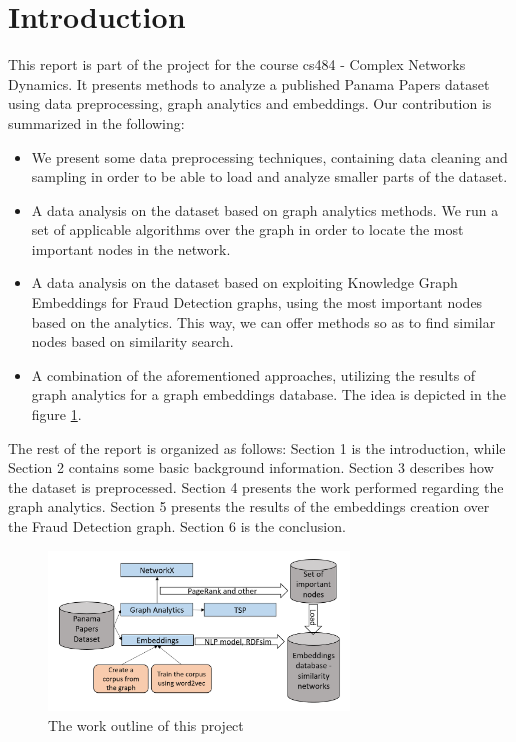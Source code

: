 \documentclass[sigconf, nonacm]{acmart}
\begin{document}
\section{Introduction}
This report is part of the project for the course cs484 - Complex Networks Dynamics. It presents methods to analyze a published Panama Papers dataset using data preprocessing, graph analytics and embeddings. Our contribution is summarized in the following:
\begin{itemize}
    \item We present some data preprocessing techniques, containing data cleaning and sampling in order to be able to load and analyze smaller parts of the dataset.
    \item A data analysis on the dataset based on graph analytics methods. We run a set of applicable algorithms over the graph in order to locate the most important nodes in the network.
    \item A data analysis on the dataset based on exploiting Knowledge Graph Embeddings for Fraud Detection graphs, using the most important nodes  based on the analytics. This way, we can offer methods so as to find similar nodes based on similarity search.
    \item A combination of the aforementioned approaches, utilizing the results of graph analytics for a graph embeddings database. The idea is depicted in the figure \ref{fig:work-outline}.
\end{itemize}
The rest of the report is organized as follows: Section 1 is the introduction, while Section 2 contains some basic background information. Section 3 describes how the dataset is preprocessed. Section 4 presents the work performed regarding the graph analytics. Section 5 presents the results of the embeddings creation over the Fraud Detection graph. Section 6 is the conclusion. 
\begin{figure}[htp]
    \centering
    \includegraphics[width=8cm]{figures/workPlan.png}
    \caption{The work outline of this project}
    \label{fig:work-outline}
\end{figure}
\end{document}
